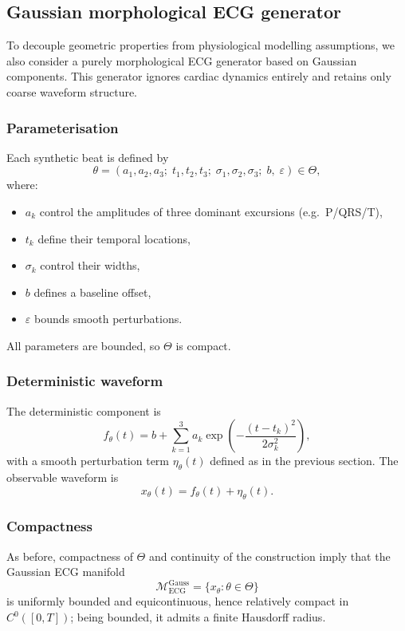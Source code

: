 \documentclass[10pt]{article}
\theoremstyle{plain}
\theoremstyle{definition}
\theoremstyle{remark}
\begin{document}
\subsection{Gaussian morphological ECG generator}

To decouple geometric properties from physiological modelling assumptions, we
also consider a purely morphological ECG generator based on Gaussian
components. This generator ignores cardiac dynamics entirely and retains only
coarse waveform structure.

\subsubsection{Parameterisation}

Each synthetic beat is defined by
\[
\theta = (a_1,a_2,a_3;\; t_1,t_2,t_3;\;
          \sigma_1,\sigma_2,\sigma_3;\; b,\; \varepsilon)
\in \Theta,
\]
where:
\begin{itemize}
    \item $a_k$ control the amplitudes of three dominant excursions
          (e.g.\ P/QRS/T),
    \item $t_k$ define their temporal locations,
    \item $\sigma_k$ control their widths,
    \item $b$ defines a baseline offset,
    \item $\varepsilon$ bounds smooth perturbations.
\end{itemize}
All parameters are bounded, so $\Theta$ is compact.

\subsubsection{Deterministic waveform}

The deterministic component is
\[
f_\theta(t)
= b + \sum_{k=1}^{3}
a_k \exp\!\left( -\frac{(t - t_k)^2}{2\sigma_k^2} \right),
\]
with a smooth perturbation term $\eta_\theta(t)$ defined as in the previous
section. The observable waveform is
\[
x_\theta(t) = f_\theta(t) + \eta_\theta(t).
\]

\subsubsection{Compactness}

As before, compactness of $\Theta$ and continuity of the construction imply
that the Gaussian ECG manifold
\[
\mathcal{M}_{\mathrm{ECG}}^{\mathrm{Gauss}}
= \{ x_\theta : \theta \in \Theta \}
\]
is uniformly bounded and equicontinuous, hence relatively compact in
$C^0([0,T])$; being bounded, it admits a finite Hausdorff radius.
\end{document}
